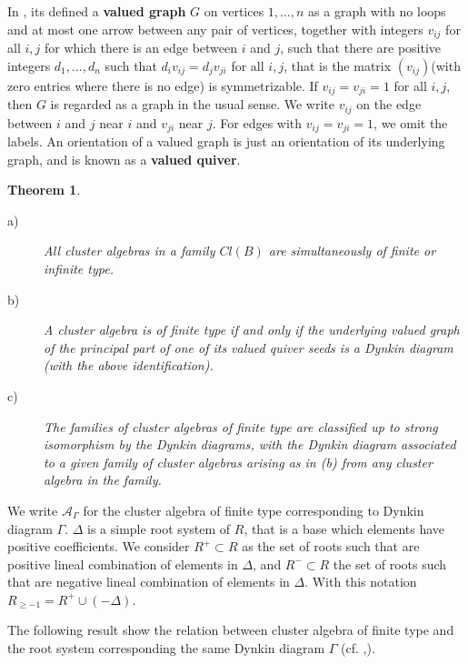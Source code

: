 \documentclass[12pt,a4paper]{article}
\newtheorem{Theorem}{Theorem}[section]
\begin{document}
In \cite{grafvaluada}, its defined a \textbf{valued graph} $G$ on vertices $1,\ldots,n$ as a graph with no loops and at most one
arrow between any pair of vertices, together with integers $v_{ij}$ for all $i,j$ for which there is an edge between $i$ and $j$, such that there are positive integers $d_1,\ldots,d_n$ such that $d_iv_{ij} = d_jv_{ji}$ for all $i,j$, that is the matrix $(v_{ij})$(with zero entries where there is no edge) is symmetrizable. If $v_{ij} = v_{ji} = 1$ for all $i, j$, then $G$ is regarded as a graph in the usual sense. We write $v_{ij}$ on the edge between $i$ and $j$ near $i$ and $v_{ji}$ near $j$. For edges with $v_{ij} = v_{ji} = 1$, we omit the labels. An orientation of a valued graph is just an orientation of its underlying graph, and is known as a \textbf{valued quiver}.

\begin{Theorem}
\begin{description}
\item[a)] All cluster algebras in a family $Cl(B)$ are simultaneously of finite or infinite type.
\item[b)] A cluster algebra is of finite type if and only if the underlying valued graph of the principal part of one of its valued quiver seeds is a Dynkin diagram (with the above identification). 
\item[c)] The families of cluster algebras of finite type are classified up to strong isomorphism by the Dynkin diagrams, with the Dynkin diagram associated to a given family of cluster algebras arising as in (b) from any cluster algebra in the family.
\end{description}
\label{teo2}
\end{Theorem}

We write $\mathcal{A}_{\Gamma}$ for the cluster algebra of finite type corresponding to Dynkin diagram $\Gamma$. $\Delta$  is a simple root system of $R$, that is a base which elements have positive coefficients. We consider $R^{+}\subset R $ as the set of roots such that are positive lineal combination of elements in $\Delta$, and $R^{-}\subset R $ the set of roots such that are negative lineal combination of elements in $\Delta$. With this notation $R_{\geq -1}=R^{+}\cup(-\Delta)$.

The following result show the relation between cluster algebra of finite type and the root system corresponding the same Dynkin diagram $\Gamma$ (cf. \cite{teor1},\cite{teor2}).
\end{document}
